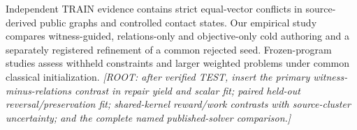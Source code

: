 Independent TRAIN evidence contains strict equal-vector conflicts in
source-derived public graphs and controlled contact states. Our empirical
study compares witness-guided, relations-only and objective-only cold
authoring and a separately registered refinement of a common rejected seed.
Frozen-program studies assess withheld constraints and larger weighted
problems under common classical initialization. \textit{[ROOT: after verified TEST, insert the primary
witness-minus-relations contrast in repair yield and scalar fit; paired
held-out reversal/preservation fit; shared-kernel reward/work contrasts with
source-cluster uncertainty; and the complete named published-solver comparison.]}
